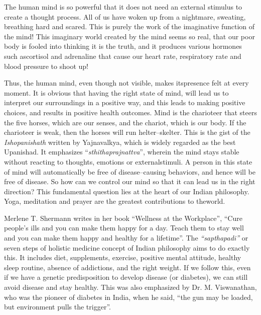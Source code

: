 The human mind is so powerful that it does not need an external stimulus to create a thought process. All of us have woken up from a nightmare, sweating, breathing hard and scared. This is purely the work of the imaginative function of the mind! This imaginary world created by the mind seems so real, that our poor body is fooled into thinking it is the truth, and it produces various hormones such as\break cortisol and adrenaline that cause our heart rate, respiratory rate and blood pressure to shoot up!

Thus, the human mind, even though not visible, makes its\break presence felt at every moment. It is obvious that having the right state of mind, will lead us to interpret our surroundings in a positive way, and this leads to making positive choices, and results in positive health outcomes. Mind is the charioteer that steers the five horses, which are our senses, and the chariot, which is our body. If the chario\-teer is weak, then the horses will run helter–skelter. This is the gist of the \textit{Ishopanishath} written by Yajnavalkya, which is widely regarded as the best Upanishad. It emphasizes “\textit{sthithaprajnattva}”, wherein the mind stays stable without reacting to thoughts, emotions or external\break stimuli. A person in this state of mind will automatically be free of disease–causing behaviors, and hence will be free of disease. So how can we control our mind so that it can lead us in the right direction? This fundamental question lies at the heart of our Indian philosophy. Yoga, meditation and prayer are the greatest contributions to the\break world.

Merlene T. Shermann writes in her book “Wellness at the Workplace”, “Cure people’s ills and you can make them happy for a day. Teach them to stay well and you can make them happy and healthy for a lifetime”. The \textit{“sapthapadi”} or seven steps of holistic medicine concept of Indian philosophy aims to do exactly this. It includes diet, supplements, exercise, positive mental attitude, healthy sleep routine, absence of addictions, and the right weight. If we follow this, even if we have a genetic predisposition to develop disease (or diabetes), we can still avoid disease and stay healthy. This was also emphasized by Dr. M. Viswanathan, who was the pioneer of diabetes in India, when he said, “the gun may be loaded, but environment pulls the trigger”.

\vskip 8pt


